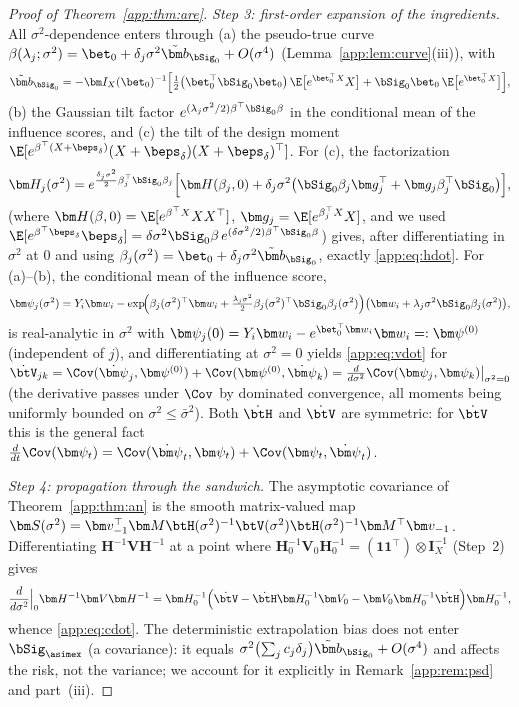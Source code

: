 \begin{proof}[Proof of Theorem~\ref{app:thm:are}]
\emph{Step 3: first-order expansion of the ingredients.} All
$\sigma^2$-dependence enters through (a) the pseudo-true curve
$\beta(\lambda_j;\sigma^2)=\bet_0+\delta_j\sigma^2
\tilde{\bm b}_{\bSig_0}+O(\sigma^4)$ (Lemma~\ref{app:lem:curve}(iii)),
with
\[
  \tilde{\bm b}_{\bSig_0}
  =-\bm I_X(\bet_0)^{-1}\Bigl[
    \tfrac12\bigl(\bet_0^\top\bSig_0\bet_0\bigr)\,
    \E\bigl[e^{\bet_0^\top X}X\bigr]
    +\bSig_0\bet_0\,\E\bigl[e^{\bet_0^\top X}\bigr]\Bigr],
\]
(b) the Gaussian tilt factor
$e^{(\lambda_j\sigma^2/2)\beta^\top\bSig_0\beta}$ in the conditional
mean of the influence scores, and (c) the tilt of the design moment
$\E[e^{\beta^\top(X+\beps_\delta)}(X+\beps_\delta)(X+\beps_\delta)^\top]$.
For (c), the factorization
\[
  \bm H_j(\sigma^2)
  =e^{\frac{\delta_j\sigma^2}{2}\beta_j^\top\bSig_0\beta_j}
   \Bigl[\bm H(\beta_j,0)
    +\delta_j\sigma^2\bigl(\bSig_0\beta_j\bm g_j^\top
      +\bm g_j\beta_j^\top\bSig_0\bigr)\Bigr],
\]
(where $\bm H(\beta,0)=\E[e^{\beta^\top X}XX^\top]$,
$\bm g_j=\E[e^{\beta_j^\top X}X]$, and we used
$\E[e^{\beta^\top\beps_\delta}\beps_\delta]
=\delta\sigma^2\bSig_0\beta\,e^{(\delta\sigma^2/2)\beta^\top\bSig_0\beta}$)
gives, after differentiating in $\sigma^2$ at $0$ and using
$\beta_j(\sigma^2)=\bet_0+\delta_j\sigma^2\tilde{\bm b}_{\bSig_0}$,
exactly \eqref{app:eq:hdot}. For (a)--(b), the conditional mean of the
influence score,
\[
  \bm\psi_j(\sigma^2)
  =Y_i\bm w_i
  -\exp\!\Bigl(\beta_j(\sigma^2)^\top\bm w_i
   +\tfrac{\lambda_j\sigma^2}{2}
    \beta_j(\sigma^2)^\top\bSig_0\beta_j(\sigma^2)\Bigr)
   \bigl(\bm w_i+\lambda_j\sigma^2\bSig_0\beta_j(\sigma^2)\bigr),
\]
is real-analytic in $\sigma^2$ with
$\bm\psi_j(0)=Y_i\bm w_i-e^{\bet_0^\top\bm w_i}\bm w_i=:\bm\psi^{(0)}$
(independent of $j$), and differentiating at $\sigma^2=0$ yields
\eqref{app:eq:vdot} for
$\dot{\btV}_{jk}=\Cov(\dot{\bm\psi}_j,\bm\psi^{(0)})
+\Cov(\bm\psi^{(0)},\dot{\bm\psi}_k)
=\frac{d}{d\sigma^2}\Cov(\bm\psi_j,\bm\psi_k)\big|_{\sigma^2=0}$
(the derivative passes under $\Cov$ by dominated convergence, all
moments being uniformly bounded on $\sigma^2\le\bar\sigma^2$). Both
$\dot{\btH}$ and $\dot{\btV}$ are symmetric: for $\dot{\btV}$ this is
the general fact $\frac{d}{dt}\Cov(\bm\psi_t)
=\Cov(\dot{\bm\psi}_t,\bm\psi_t)+\Cov(\bm\psi_t,\dot{\bm\psi}_t)$.

\emph{Step 4: propagation through the sandwich.} The asymptotic
covariance of Theorem~\ref{app:thm:an} is the smooth matrix-valued map
$\bm S(\sigma^2)=\bm v_{-1}^\top\bm M\btH(\sigma^2)^{-1}
\btV(\sigma^2)\btH(\sigma^2)^{-1}\bm M^\top\bm v_{-1}$. Differentiating
$\bm H^{-1}\bm V\bm H^{-1}$ at a point where
$\bm H_0^{-1}\bm V_0\bm H_0^{-1}
=(\bm 1\bm 1^\top)\otimes\bm I_X^{-1}$ (Step~2) gives
\[
  \frac{d}{d\sigma^2}\Big|_{0}\bm H^{-1}\bm V\bm H^{-1}
  =\bm H_0^{-1}\Bigl(\dot{\btV}
    -\dot{\btH}\bm H_0^{-1}\bm V_0
    -\bm V_0\bm H_0^{-1}\dot{\btH}\Bigr)\bm H_0^{-1},
\]
whence \eqref{app:eq:cdot}. The deterministic extrapolation bias does not
enter $\bSig_{\asimex}$ (a covariance): it equals
$\sigma^2\bigl(\sum_jc_j\delta_j\bigr)\tilde{\bm b}_{\bSig_0}+O(\sigma^4)$
and affects the risk, not the variance; we account for it explicitly in
Remark~\ref{app:rem:psd} and part~(iii).


\end{proof}
